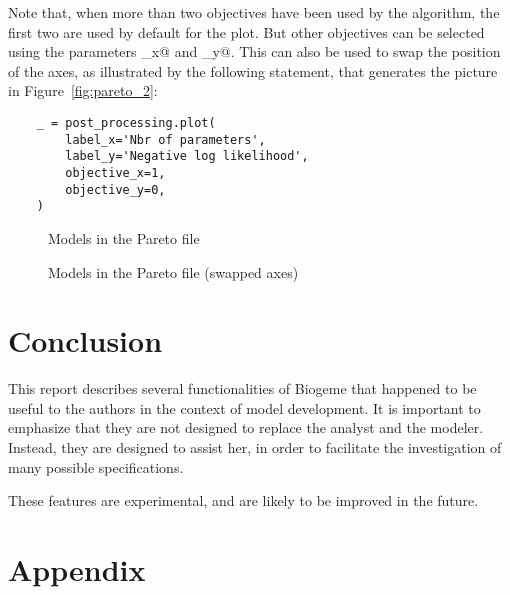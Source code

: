 \documentclass[12pt,a4paper]{article}
\begin{document}
Note that, when more than two objectives have been used by the algorithm, the first two are used by default for the plot. But other objectives can be selected using the parameters \lstinline@objective_x@ and \lstinline@objective_y@. This can also be used to swap the position of the axes, as illustrated by the following statement, that generates the picture in Figure~\vref{fig:pareto_2}:
\begin{lstlisting}
    _ = post_processing.plot(
        label_x='Nbr of parameters',
        label_y='Negative log likelihood',
        objective_x=1,
        objective_y=0,
    )
\end{lstlisting}

\begin{figure}
  \begin{center}
  \end{center}
  \caption{\label{fig:pareto}Models in the Pareto file}
\end{figure}

\begin{figure}
  \begin{center}
  \end{center}
  \caption{\label{fig:pareto_2}Models in the Pareto file (swapped axes)}
\end{figure}

\section{Conclusion}

This report describes several functionalities of Biogeme that happened
to be useful to the authors in the context of model development. It is
important to emphasize that they are not designed to replace the
analyst and the modeler. Instead, they are designed to assist her, in
order to facilitate the investigation of many possible specifications.

These features are experimental, and are likely to be improved in the future. 




\clearpage
\appendix
\renewcommand{\thesection}{\arabic{section}}

\section*{Appendix}
\end{document}
